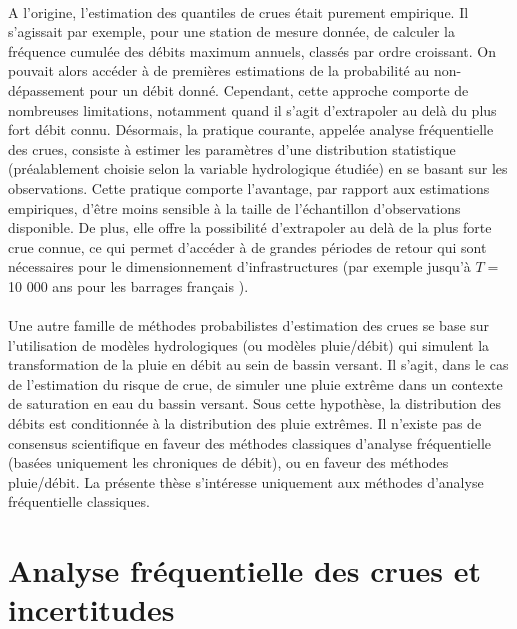 \documentclass[11pt]{article}
\begin{document}
	\paragraph{} A l'origine, l'estimation des quantiles de crues était purement empirique. Il s'agissait par exemple, pour une station de mesure donnée, de calculer la fréquence cumulée des débits maximum annuels, classés par ordre croissant. On pouvait alors accéder à de premières estimations de la probabilité au non-dépassement pour un débit donné. Cependant, cette approche comporte de nombreuses limitations, notamment quand il s'agit d'extrapoler au delà du plus fort débit connu. Désormais, la pratique courante, appelée analyse fréquentielle des crues, consiste à estimer les paramètres d'une distribution statistique (préalablement choisie selon la variable hydrologique étudiée) en se basant sur les observations. Cette pratique comporte l'avantage, par rapport aux estimations empiriques, d'être moins sensible à la taille de l'échantillon d'observations disponible. De plus, elle offre la possibilité d'extrapoler au delà de la plus forte crue connue, ce qui permet d'accéder à de grandes périodes de retour qui sont nécessaires pour le dimensionnement d'infrastructures (par exemple jusqu'à $T =$ 10 000 ans pour les barrages français \citep{le_delliou_recommandations_2014}). 
	
	\paragraph{} Une autre famille de méthodes probabilistes d'estimation des crues se base sur l'utilisation de modèles hydrologiques (ou modèles pluie/débit) qui simulent la transformation de la pluie en débit au sein de bassin versant. Il s'agit, dans le cas de l'estimation du risque de crue, de simuler une pluie extrême dans un contexte de saturation en eau du bassin versant. Sous cette hypothèse, la distribution des débits est conditionnée à la distribution des pluie extrêmes. Il n'existe pas de consensus scientifique en faveur des méthodes classiques d'analyse fréquentielle (basées uniquement les chroniques de débit), ou en faveur des méthodes pluie/débit. La présente thèse s'intéresse uniquement aux méthodes d'analyse fréquentielle classiques.
		
		
	\section{Analyse fréquentielle des crues et incertitudes}
	
\end{document}
